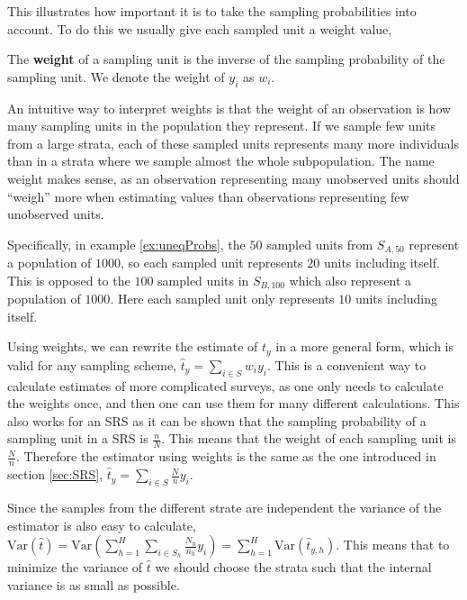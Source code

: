 \documentclass{article}
\begin{document}
This illustrates how important it is to take the sampling probabilities into
account. To do this we usually give each sampled unit a weight value,

\begin{definition}
 The \textbf{weight} of a sampling unit is the inverse of the sampling
 probability of the sampling unit. 
 We denote the weight of \(y_i\) as \(w_i\).
\end{definition}

An intuitive way to interpret weights is that the weight of an observation is
how many sampling units in the population they represent. If we sample few units
from a large strata, each of these sampled units represents many more individuals than
in a strata where we sample almost the whole subpopulation. The name weight
makes sense, as an observation representing many unobserved units should
``weigh'' more when estimating values than observations representing few
unobserved units.

Specifically, in example \ref{ex:uneqProbs}, the \(50\) sampled units from \(S_{A,
  50}\) represent a population of \(1000\), so each sampled unit represents
\(20\) units including itself. This is opposed to the \(100\) sampled units in
\(S_{B, 100}\) which also represent a population of \(1000\). Here each sampled
unit only represents \(10\) units including itself.


Using weights, we can rewrite the estimate of \(t_y\) in a more general form,
which is valid for any sampling scheme, \(\hat{t}_y = \sum_{i \in S}w_i y_i\).
This is a convenient way to calculate estimates of more complicated surveys, as
one only needs to calculate the weights once, and then one can use them for many
different calculations.
This also works for an SRS as it can be shown that the sampling probability of a sampling unit in a SRS is
\(\frac{n}{N}\). This means that the weight of each sampling unit is
\(\frac{N}{n}\). Therefore the estimator using weights is the same as the one
introduced in section \ref{sec:SRS}, \(\hat{t}_y = \sum_{i \in S}\frac{N}{n} y_i\).

Since the samples from the different strate are independent the variance of the estimator is also
easy to calculate, \(\mathrm{Var}(\hat{t}) = \mathrm{Var}\left(\sum_{h =
   1}^H\sum_{i \in S_h}\frac{N_h}{n_h}y_i\right) = \sum_{h =
   1}^H\mathrm{Var}\left(\hat{t}_{y, h}\right)\). This
means that to minimize the variance of \(\hat{t}\) we should choose the strata
such that the internal variance is as small as possible.
\end{document}
